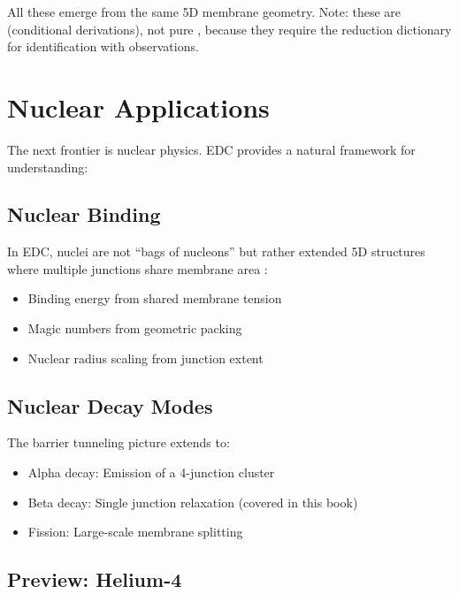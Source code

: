 All these emerge from the same 5D membrane geometry. Note: these are \tagDc{}
(conditional derivations), not pure \tagDer{}, because they require the
reduction dictionary for identification with observations.

\section{Nuclear Applications}

The next frontier is nuclear physics. EDC provides a natural framework
for understanding:

\subsection{Nuclear Binding}

In EDC, nuclei are not ``bags of nucleons'' but rather extended 5D
structures where multiple junctions share membrane area \tagP{}:

\begin{itemize}[nosep]
\item Binding energy from shared membrane tension \tagI{}
\item Magic numbers from geometric packing \tagI{}
\item Nuclear radius scaling from junction extent \tagI{}
\end{itemize}

\subsection{Nuclear Decay Modes}

The barrier tunneling picture extends to:
\begin{itemize}[nosep]
\item Alpha decay: Emission of a 4-junction cluster
\item Beta decay: Single junction relaxation (covered in this book)
\item Fission: Large-scale membrane splitting
\end{itemize}

\subsection{Preview: Helium-4}

